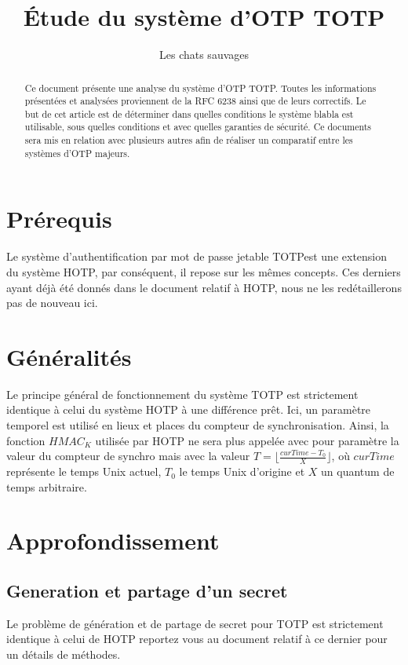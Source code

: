 \documentclass{../res/univ-projet}
\title{\'Etude du syst\`eme d'OTP \og{}TOTP\fg{}}
\author{Les chats sauvages}
\begin{document}
\maketitle

\begin{abstract}
Ce document présente une analyse du système d'OTP \og{}TOTP\fg{}. Toutes les informations présentées et analysées proviennent de la RFC 6238 ainsi que de leurs 
correctifs. Le but de cet article est de déterminer dans quelles conditions le système blabla est utilisable, sous quelles conditions et avec quelles garanties de sécurité.
Ce documents sera mis en relation avec plusieurs autres afin de réaliser un comparatif entre les systèmes d'OTP majeurs.
\end{abstract}
\newpage
\tableofcontents
\newpage

\section{Prérequis}
Le système d'authentification par mot de passe jetable \og{}TOTP\fg est une extension du système \og{}HOTP\fg{}, par conséquent, il repose sur les m\^emes concepts. Ces 
derniers ayant déjà été donnés dans le document relatif à \og{}HOTP\fg{}, nous ne les redétaillerons pas de nouveau ici.

\section{Généralités}
Le principe général de fonctionnement du système \og{}TOTP\fg{} est strictement identique à celui du système \og{}HOTP\fg{} à une différence pr\^et. Ici, un paramètre 
temporel est utilisé en lieux et places du compteur de synchronisation. Ainsi, la fonction $HMAC_K$ utilisée par \og{}HOTP\fg{} ne sera plus appelée avec pour paramètre la 
valeur du compteur de synchro mais avec la valeur $T = \lfloor{}\frac{curTime - T_0}{X}\rfloor{}$, o\`u $curTime$ représente le temps Unix actuel, $T_0$ le temps Unix \og{}
d'origine\fg{} et $X$ un quantum de temps arbitraire.

\section{Approfondissement}
  \subsection{Generation et partage d'un secret}
    Le problème de génération et de partage de secret pour \og{}TOTP\fg{} est strictement identique à celui de \og{}HOTP\fg{} reportez vous au document relatif à ce 
    dernier pour un détails de méthodes.
    
\end{document}
